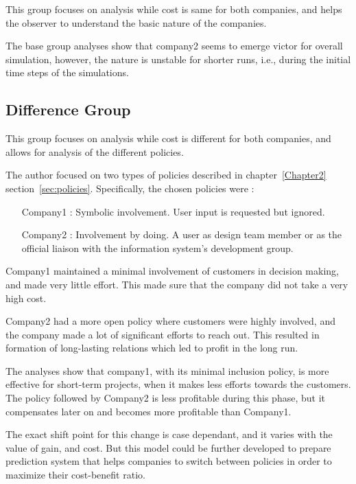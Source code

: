This group focuses on analysis while cost is same for both companies, and helps the observer to understand the basic nature of the companies. 

The base group analyses show that company2 seems to emerge victor for overall simulation, however, the nature is unstable for shorter runs, i.e., during the initial time steps of the simulations.



\subsection{Difference Group}

This group focuses on analysis while cost is different for both companies, and allows for analysis of the different policies.

The author focused on two types of policies described in chapter~\ref{Chapter2} section~\ref{sec:policies}. Specifically, the chosen policies were :

\begin{enumerate}
\item[Company1 :] Symbolic involvement. User input is requested but ignored.
\item[Company2 :] Involvement by doing. A user as design team member or as the official liaison with the information system’s development group.
\end{enumerate}


Company1 maintained a minimal involvement of customers in decision making, and made very little effort. This made sure that the company did not take a very high cost. 

Company2 had a more open policy where customers were highly involved, and the company made a lot of significant efforts to reach out. This resulted in formation of long-lasting relations which led to profit in the long run.

The analyses show that company1, with its minimal inclusion policy, is more effective for short-term projects, when it makes less efforts towards the customers. The policy followed by Company2 is less profitable during this phase, but it compensates later on and becomes more profitable than Company1.

The exact shift point for this change is case dependant, and it varies with the value of gain, and cost. But this model could be further developed to prepare prediction system that helps companies to switch between policies in order to maximize their cost-benefit ratio.
